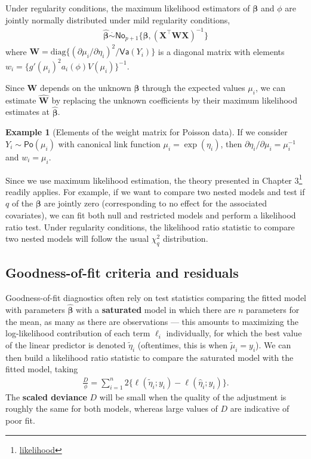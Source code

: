 \documentclass[
  11pt,
  letterpaper,
]{book}
\renewcommand{\href}[2]{#2\footnote{\url{#1}}}
\theoremstyle{definition}
\theoremstyle{definition}
\newtheorem{example}{Example}[chapter]
\theoremstyle{definition}
\theoremstyle{remark}
\begin{document}
Under regularity conditions, the maximum likelihood estimators of
\(\boldsymbol{\beta}\) and \(\phi\) are jointly normally distributed under
mild regularity conditions,
\begin{align*}
\widehat{\boldsymbol{\beta}} \stackrel{\cdot}{\sim}\mathsf{No}_{p+1}\{\boldsymbol{\beta}, (\mathbf{X}^\top\mathbf{W}\mathbf{X})^{-1}\}
\end{align*}
where
\(\mathbf{W} = \mathrm{diag}\{(\partial \mu_i/\partial \eta_i)^2/\mathsf{Va}(Y_i)\}\)
is a diagonal matrix with elements
\(w_i=\{g'(\mu_i)^2a_i(\phi)V(\mu_i)\}^{-1}\).

Since \(\mathbf{W}\) depends on the unknown \(\boldsymbol{\beta}\) through
the expected values \(\mu_i\), we can estimate \(\widehat{\mathbf{W}}\) by
replacing the unknown coefficients by their maximum likelihood estimates
at \(\widehat{\boldsymbol{\beta}}\).

\begin{example}[Elements of the weight matrix for Poisson data]
\protect\hypertarget{exm:weightpois}{}{\label{exm:weightpois} {} }If we consider \(Y_i \sim \mathsf{Po}(\mu_i)\) with canonical link function \(\mu_i = \exp(\eta_i)\), then \(\partial \eta_i / \partial \mu_i = \mu_i^{-1}\) and \(w_i=\mu_i\).
\end{example}

Since we use maximum likelihood estimation, the theory presented in
\href{likelihood}{Chapter 3} readily applies. For example, if we want to
compare two nested models and test if \(q\) of the \(\boldsymbol{\beta}\)
are jointly zero (corresponding to no effect for the associated
covariates), we can fit both null and restricted models and perform a
likelihood ratio test. Under regularity conditions, the likelihood ratio
statistic to compare two nested models will follow the usual \(\chi^2_q\)
distribution.

\hypertarget{goodness-of-fit-criteria-and-residuals}{%
\subsection{Goodness-of-fit criteria and residuals}\label{goodness-of-fit-criteria-and-residuals}}

Goodness-of-fit diagnostics often rely on test statistics comparing the
fitted model with parameters \(\widehat{\boldsymbol{\beta}}\) with a
\textbf{saturated} model in which there are \(n\) parameters for the mean, as
many as there are observations --- this amounts to maximizing the
log-likelihood contribution of each term \(\ell_i\) individually, for
which the best value of the linear predictor is denoted
\(\widetilde{\eta}_i\) (oftentimes, this is when \(\widetilde{\mu}_i=y_i\)).
We can then build a likelihood ratio statistic to compare the saturated
model with the fitted model, taking
\begin{align*}
\frac{D}{\phi}= \sum_{i=1}^n 2\{\ell(\widetilde{\eta}_i; y_i) - \ell(\widehat{\eta}_i; y_i)\}.
\end{align*}
The \textbf{scaled deviance} \(D\) will be small when the quality
of the adjustment is roughly the same for both models, whereas large
values of \(D\) are indicative of poor fit.
\end{document}
